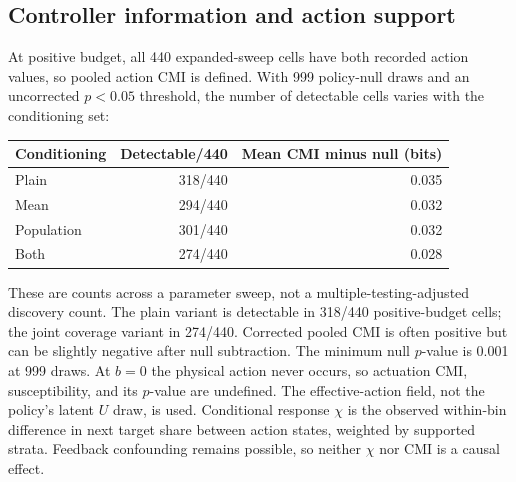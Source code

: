 \documentclass[10pt,a4paper]{article}
\begin{document}
\subsection{Controller information and action support}
At positive budget, all 440 expanded-sweep cells have both recorded action
values, so pooled action CMI is defined. With 999 policy-null draws and an
uncorrected $p<0.05$ threshold, the number of detectable cells varies with
the conditioning set:
\begin{center}\begin{tabular}{lrr}\toprule
Conditioning & Detectable/440 & Mean CMI minus null (bits)\\\midrule
Plain & 318/440 & 0.035\\
Mean & 294/440 & 0.032\\
Population & 301/440 & 0.032\\
Both & 274/440 & 0.028\\
\bottomrule\end{tabular}\end{center}
These are counts across a parameter sweep, not a multiple-testing-adjusted
discovery count. The plain variant is detectable in 318/440 positive-budget
cells; the joint coverage variant in 274/440. Corrected pooled CMI is often
positive but can be slightly negative after null subtraction. The minimum
null $p$-value is 0.001 at 999 draws. At $b=0$ the physical action never
occurs, so actuation CMI, susceptibility, and its $p$-value are undefined.
The effective-action field, not the policy's latent $U$ draw, is used.
Conditional response $\chi$ is the observed within-bin difference in next
target share between action states, weighted by supported strata. Feedback
confounding remains possible, so neither $\chi$ nor CMI is a causal effect.
\end{document}
